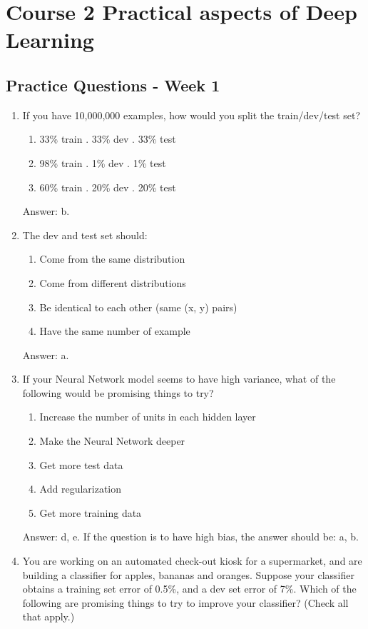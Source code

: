 \documentclass[12pt]{article}
\numberwithin{equation}{section}
\begin{document}
\section{Course 2 Practical aspects of Deep Learning} 
\subsection{Practice Questions - Week 1}
\begin{enumerate}
	\item If you have 10,000,000 examples, how would you split the train/dev/test set?
	\begin{enumerate}
		\item 33\% train . 33\% dev . 33\% test
		\item 98\% train . 1\% dev . 1\% test
		\item 60\% train . 20\% dev . 20\% test
	\end{enumerate}\par
	Answer: b.
	\item The dev and test set should:
	\begin{enumerate}
		\item Come from the same distribution
		\item Come from different distributions
		\item Be identical to each other (same (x, y) pairs)
		\item Have the same number of example
	\end{enumerate}\par
	Answer: a.
	\item If your Neural Network model seems to have high variance, what of the following would be promising things to try?
	\begin{enumerate}
		\item Increase the number of units in each hidden layer
		\item Make the Neural Network deeper
		\item Get more test data
		\item Add regularization
		\item Get more training data
	\end{enumerate}\par
	Answer: d, e. If the question is to have high bias, the answer should be: a, b.
	\item You are working on an automated check-out kiosk for a supermarket, and are building a classifier for apples, bananas and oranges. Suppose your classifier obtains a training set error of 0.5\%, and a dev set error of 7\%. Which of the following are promising things to try to improve your classifier? (Check all that apply.)

\end{enumerate}
\end{document}
